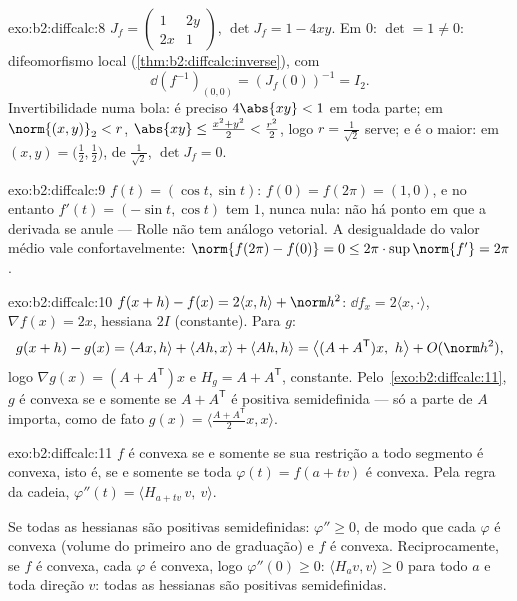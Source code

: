 \begin{solution}{exo:b2:diffcalc:8}
$J_f = \begin{pmatrix} 1 & 2y\\ 2x & 1\end{pmatrix}$, $\det J_f =
1 - 4xy$. Em $0$: $\det = 1 \neq 0$: difeomorfismo local
(\cref{thm:b2:diffcalc:inverse}), com
\[
\dd(f^{-1})_{(0,0)} = (J_f(0))^{-1} = I_2 .
\]
Invertibilidade numa bola: é preciso $4\abs{xy} < 1$ em toda parte; em
$\norm{(x,y)}_2 < r$, $\abs{xy} \leq \frac{x^2 + y^2}{2} <
\frac{r^2}{2}$, logo $r = \frac{1}{\sqrt2}$ serve; e é o maior:
em $(x, y) = \bigl(\tfrac12, \tfrac12\bigr)$, de 
$\frac{1}{\sqrt2}$, $\det J_f = 0$.
\end{solution}

\begin{solution}{exo:b2:diffcalc:9}
$f(t) = (\cos t, \sin t)$: $f(0) = f(2\pi) = (1, 0)$, e no entanto $f'(t) =
(-\sin t, \cos t)$ tem  $1$, nunca nula: não há ponto em que a
derivada se anule --- Rolle não tem análogo vetorial. A desigualdade
do valor médio vale confortavelmente: $\norm{f(2\pi) - f(0)} = 0 \leq
2\pi \cdot \sup\norm{f'} = 2\pi$.
\end{solution}

\begin{solution}{exo:b2:diffcalc:10}
$f(x+h) - f(x) = 2\langle x, h\rangle + \norm h^2$: $\dd f_x =
2\langle x, \cdot\rangle$, $\nabla f(x) = 2x$, hessiana $2I$
(constante). Para $g$:
\[
g(x + h) - g(x) = \langle Ax, h\rangle + \langle Ah, x\rangle
+ \langle Ah, h\rangle
= \bigl\langle (A + A^{\mathsf T})x,\ h\bigr\rangle +
O(\norm h^2),
\]
logo $\nabla g(x) = (A + A^{\mathsf T})x$ e $H_g = A +
A^{\mathsf T}$, constante. Pelo~\cref{exo:b2:diffcalc:11}, $g$ é
convexa se e somente se $A + A^{\mathsf T}$ é positiva semidefinida ---
só a parte  de $A$ importa, como de fato $g(x) =
\langle \frac{A + A^{\mathsf T}}2 x, x\rangle$.
\end{solution}

\begin{solution}{exo:b2:diffcalc:11}
$f$ é convexa se e somente se sua restrição a todo segmento é convexa,
isto é, se e somente se toda $\varphi(t) = f(a + tv)$ é convexa. Pela regra
da cadeia, $\varphi''(t) = \langle H_{a+tv}\,v,\ v\rangle$.

Se todas as hessianas são positivas semidefinidas: $\varphi'' \geq 0$,
de modo que cada $\varphi$ é convexa (volume do primeiro ano de graduação) e $f$ é convexa.
Reciprocamente, se $f$ é convexa, cada $\varphi$ é convexa, logo
$\varphi''(0) \geq 0$: $\langle H_a v, v\rangle \geq 0$ para
todo $a$ e toda direção $v$: todas as hessianas são positivas
semidefinidas.
\end{solution}

